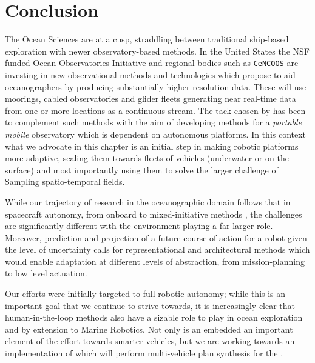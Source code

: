 \section{Conclusion}


The Ocean Sciences are at a cusp, straddling between traditional
ship-based exploration with newer observatory-based methods. In the
United States the NSF funded Ocean Observatories Initiative \cite{ooi}
and regional bodies such as \texttt{CeNCOOS} \cite{cencoos} are
investing in new observational methods and technologies which propose
to aid oceanographers by producing substantially higher-resolution
data. These will use moorings, cabled observatories and glider fleets
generating near real-time data from one or more locations as a
continuous stream. The tack chosen by \can has been to complement such
methods with the aim of developing methods for a \emph{portable
  mobile} observatory which is dependent on autonomous platforms. In
this context what we advocate in this chapter is an initial step in
making robotic platforms more adaptive, scaling them towards fleets of
vehicles (underwater or on the surface) and most importantly using
them to solve the larger challenge of Sampling spatio-temporal fields.

While our trajectory of research in the oceanographic domain follows
that in spacecraft autonomy, from onboard \cite{mus98} to
mixed-initiative methods \cite{bresina05}, the challenges are
significantly different with the environment playing a far larger
role. Moreover, prediction and projection of a future course of action
for a robot given the level of uncertainty calls for representational
and architectural methods which would enable adaptation at different
levels of abstraction, from mission-planning to low level actuation. 

Our efforts were initially targeted to full robotic autonomy; while
this is an important goal that we continue to strive towards, it is
increasingly clear that human-in-the-loop methods also have a sizable
role to play in ocean exploration and by extension to Marine
Robotics. Not only is an embedded \rx an important element of the
effort towards smarter vehicles, but we are working towards an
implementation of \rx which will perform multi-vehicle plan synthesis
for the \od.

